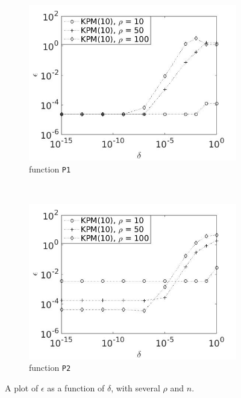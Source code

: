 \begin{figure}[H]
        \begin{subfigure}[b]{0.45\textwidth}
                \includegraphics[width=\textwidth]{fig/s15errvstol1m10}
                \caption{function \texttt{P1}}
                \label{fig:epsilondelta3}
        \end{subfigure}
~
        \begin{subfigure}[b]{0.45\textwidth}
                \includegraphics[width=\textwidth]{fig/s16errvstol2m10}
                \caption{ function \texttt{P2}}
                \label{fig:epsilondelta4}
        \end{subfigure}
        
        \caption{A plot of $\epsilon$ as a function of $\delta$, with several $\rho$ and $n$.} \label{fig:epsilondelta}
\end{figure}
